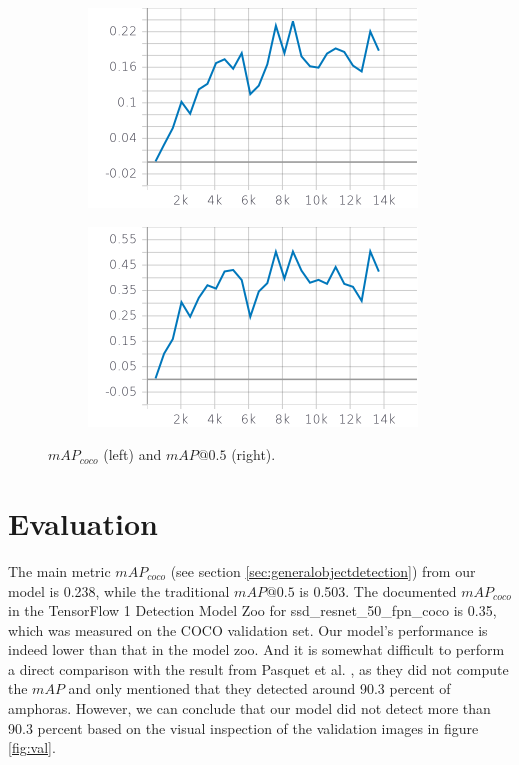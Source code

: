 \documentclass[a4paper, 11pt, oneside]{article}
\begin{document}
\begin{figure}[ht]
  \centering
  \begin{subfigure}[ht]{0.4\textwidth}
      \centering
      \includegraphics[width=\textwidth]{mapcoco.png}
  \end{subfigure}
  \bigskip
  \begin{subfigure}[ht]{0.4\textwidth}
      \centering
      \includegraphics[width=\textwidth]{map50.png}
  \end{subfigure}
  \caption{$mAP_{coco}$ (left) and $mAP@0.5$ (right).}
\end{figure}

\section{Evaluation}

The main metric $mAP_{coco}$ (see section \ref{sec:generalobjectdetection}) from our model is 0.238, while the
traditional $mAP@0.5$ is 0.503. The documented $mAP_{coco}$ in the TensorFlow 1 Detection Model Zoo for
ssd\_resnet\_50\_fpn\_coco is 0.35, which was measured on the COCO validation set. Our model's performance is indeed
lower than that in the model zoo. And it is somewhat difficult to perform a direct comparison with the result from
Pasquet et al. \cite{pasquet2017amphora}, as they did not compute the $mAP$ and only mentioned that they detected
around 90.3 percent of amphoras. However, we can conclude that our model did not detect more than 90.3 percent based
on the visual inspection of the validation images in figure \ref{fig:val}.
\end{document}
